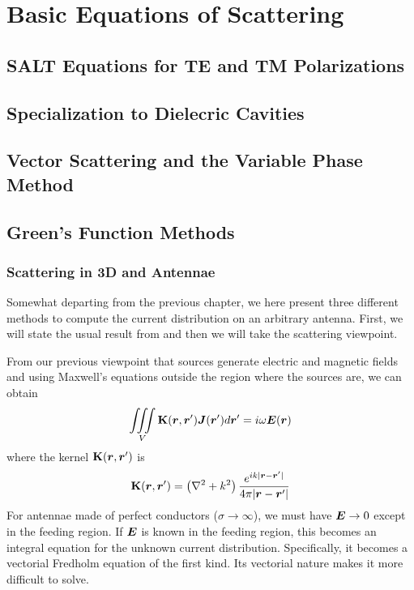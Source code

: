 \chapter{Basic Equations of Scattering}\label{app:basicEquations}

\section{SALT Equations for TE and TM Polarizations}

\section{Specialization to Dielecric Cavities}

\section{Vector Scattering and the Variable Phase Method}

\section{Green's Function Methods}

\subsection{Scattering in 3D and Antennae}
Somewhat departing from the previous chapter, we here present
three different methods to compute the current distribution on 
an arbitrary antenna. First, we will state the usual result 
from \cite{ELL2003} and then we will take the scattering viewpoint.

From our previous
viewpoint that sources generate electric and magnetic fields 
and using Maxwell's equations outside the region where the sources 
are, we can obtain \cite{ELL2003}
  \begin{equation}
    \mathop{\iiint}_V \mathbf{K}(\boldsymbol{r},\boldsymbol{r}')\boldsymbol{J}(\boldsymbol{r}')d\boldsymbol{r}' = i\omega\boldsymbol{E}(\boldsymbol{r})
  \end{equation}
where the kernel $\mathbf{K}(\boldsymbol{r},\boldsymbol{r}')$ is 
  \begin{equation}
    \mathbf{K}(\boldsymbol{r},\boldsymbol{r}') = \left(\nabla^2+k^2\right)\frac{e^{ik|\boldsymbol{r}-\boldsymbol{r}'|}}{4\pi|\boldsymbol{r}-\boldsymbol{r}'|}
  \end{equation}
For antennae made of perfect conductors ($\sigma\rightarrow\infty$), we must have $\boldsymbol{E}\rightarrow0$
except in the feeding region. If $\boldsymbol{E}$ is known in the feeding region, this becomes an integral equation
for the unknown current distribution. Specifically, it becomes a vectorial Fredholm equation of the first kind. 
Its vectorial nature makes it more difficult to solve. 


